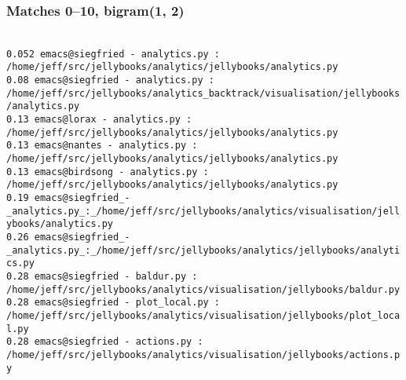 \begin{frame}
  \frametitle{Matches 0--10, bigram(1, 2)}
  \tt\tiny
{}\\[2mm]
\hspace{2mm}0.052 emacs@siegfried - analytics.py : /home/jeff/src/jellybooks/analytics/jellybooks/analytics.py\\
\hspace{2mm}0.08 emacs@siegfried - analytics.py : /home/jeff/src/jellybooks/analytics\_backtrack/visualisation/jellybooks/analytics.py\\
\hspace{2mm}0.13 emacs@lorax - analytics.py : /home/jeff/src/jellybooks/analytics/jellybooks/analytics.py\\
\hspace{2mm}0.13 emacs@nantes - analytics.py : /home/jeff/src/jellybooks/analytics/jellybooks/analytics.py\\
\hspace{2mm}0.13 emacs@birdsong - analytics.py : /home/jeff/src/jellybooks/analytics/jellybooks/analytics.py\\
\hspace{2mm}0.19 emacs@siegfried\_-\_analytics.py\_:\_/home/jeff/src/jellybooks/analytics/visualisation/jellybooks/analytics.py\\
\hspace{2mm}0.26 emacs@siegfried\_-\_analytics.py\_:\_/home/jeff/src/jellybooks/analytics/jellybooks/analytics.py\\
\hspace{2mm}0.28 emacs@siegfried - baldur.py : /home/jeff/src/jellybooks/analytics/visualisation/jellybooks/baldur.py\\
\hspace{2mm}0.28 emacs@siegfried - plot\_local.py : /home/jeff/src/jellybooks/analytics/visualisation/jellybooks/plot\_local.py\\
\hspace{2mm}0.28 emacs@siegfried - actions.py : /home/jeff/src/jellybooks/analytics/visualisation/jellybooks/actions.py
\end{frame}

